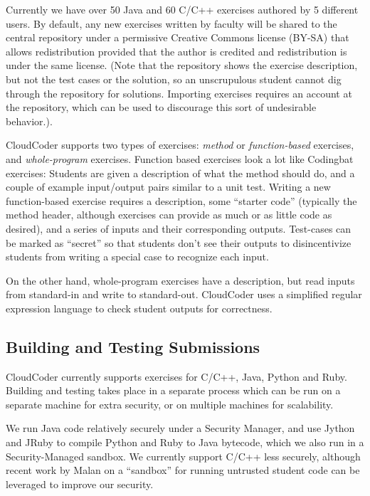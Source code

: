 \documentclass{sig-alternate}
\begin{document}
Currently we have over 50 Java and 60 C/C++ exercises authored by 5
different users.  By default,
any new exercises written by faculty will be shared to the 
central repository under a permissive Creative Commons license (BY-SA)
that allows redistribution provided that the author is credited and
redistribution is under the same license.  
(Note that the repository shows the exercise description, but not the
test cases or the solution, so an unscrupulous student cannot dig through the
repository for solutions.  Importing exercises requires an account at
the repository, which can be used to discourage this sort of
undesirable behavior.).

CloudCoder supports two types of exercises:  {\em method} or {\em function-based}
exercises, and {\em whole-program} exercises.  Function based exercises look
a lot like Codingbat exercises:  Students are given a description of
what the method should do, and a couple of example input/output pairs
similar to a unit test.  Writing a new function-based exercise
requires a description, some ``starter code'' (typically the method
header, although exercises can provide as much or as little code as
desired), and a series of inputs and their corresponding outputs.
Test-cases can be marked as ``secret'' so that students don't see their
outputs to disincentivize students from writing a special case to
recognize each input.

On the other hand, whole-program exercises
have a description, but read inputs from
standard-in and write to standard-out.  CloudCoder uses a
simplified regular expression language to check student outputs for
correctness.


\subsection{Building and Testing Submissions}

CloudCoder currently supports exercises for C/C++, Java, Python and
Ruby.  Building and testing takes place in a separate process which
can be run on a separate machine for extra security, or on multiple
machines for scalability.

We run Java code relatively securely under a Security Manager, and 
use Jython and JRuby to compile Python and Ruby to Java
bytecode, which we also run in a Security-Managed sandbox.  We
currently support C/C++ less securely, although 
recent work by Malan \cite{Malan:2013:CSS:2445196.2445242} on a
``sandbox'' for running untrusted student code can be leveraged to improve our security.
\end{document}
